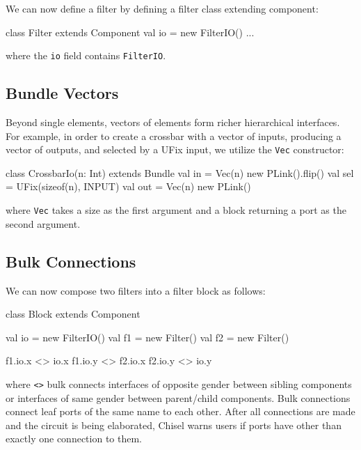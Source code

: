 \documentclass[twocolumn,10pt]{article}
\begin{document}
We can now define a filter by defining a filter class extending component:

\begin{scala}
class Filter extends Component { 
  val io = new FilterIO()
  ...
}
\end{scala}

\noindent 
where the \verb+io+ field contains \verb+FilterIO+. 

\subsection{Bundle Vectors}

Beyond single elements, vectors of elements form richer hierarchical interfaces.  
For example, in order to create a crossbar with a vector of inputs, producing a vector of outputs, and selected by a UFix input, 
we utilize the \verb+Vec+ constructor:

\begin{scala}
class CrossbarIo(n: Int) extends Bundle {
  val in  = Vec(n){ new PLink().flip() }
  val sel = UFix(sizeof(n), INPUT)
  val out = Vec(n){ new PLink() }
}
\end{scala}


\noindent
where \verb+Vec+ takes a size as the first argument and a block returning a port as the second argument.

\subsection{Bulk Connections}

We can now compose two filters into a filter block as follows:

\begin{scala}
class Block extends Component { 
  val io = new FilterIO()
  val f1 = new Filter()
  val f2 = new Filter()

  f1.io.x <> io.x
  f1.io.y <> f2.io.x
  f2.io.y <> io.y
}
\end{scala}

\noindent
where \verb+<>+ bulk connects interfaces of opposite gender between
sibling components or interfaces of same gender between parent/child components. 
Bulk connections connect leaf ports of the same name to each other.
After all connections are made and the circuit is being elaborated,
Chisel warns users if ports have other than exactly one connection to them.
\end{document}
